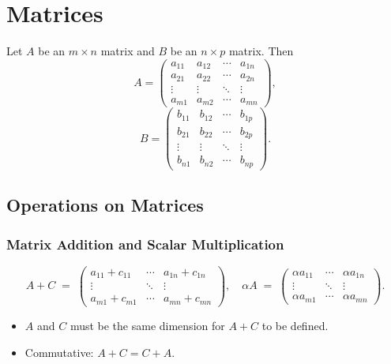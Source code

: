 \section{Matrices}
Let $A$ be an $m \times n$ matrix and $B$ be an $n \times p$ matrix. Then
\[
A =
\begin{pmatrix}
a_{11} & a_{12} & \cdots & a_{1n} \\
a_{21} & a_{22} & \cdots & a_{2n} \\
\vdots & \vdots & \ddots & \vdots \\
a_{m1} & a_{m2} & \cdots & a_{mn}
\end{pmatrix},
\]
\[
B =
\begin{pmatrix}
b_{11} & b_{12} & \cdots & b_{1p} \\
b_{21} & b_{22} & \cdots & b_{2p} \\
\vdots & \vdots & \ddots & \vdots \\
b_{n1} & b_{n2} & \cdots & b_{np}
\end{pmatrix}.
\]

\subsection{Operations on Matrices}
\subsubsection{Matrix Addition and Scalar Multiplication}
\[
A + C \;=\;
\begin{pmatrix}
a_{11} + c_{11} & \cdots & a_{1n} + c_{1n} \\
\vdots & \ddots & \vdots \\
a_{m1} + c_{m1} & \cdots & a_{mn} + c_{mn}
\end{pmatrix},
\quad
\alpha A \;=\;
\begin{pmatrix}
\alpha a_{11} & \cdots & \alpha a_{1n} \\
\vdots & \ddots & \vdots \\
\alpha a_{m1} & \cdots & \alpha a_{mn}
\end{pmatrix}.
\]
\begin{itemize}
\item $A$ and $C$ must be the same dimension for $A + C$ to be defined.
\item Commutative: $A + C = C + A$.
\end{itemize}

